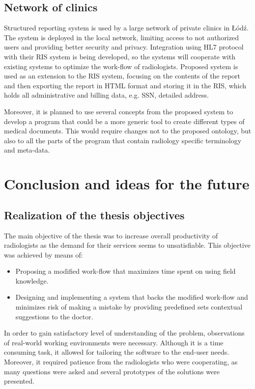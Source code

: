 \documentclass[12pt, twoside, openany]{report}
\theoremstyle{definition}
\begin{document}
\section{Network of clinics}
Structured reporting system is used by a large network of private clinics in Łódź. The system is deployed in the local network, limiting access to not authorized users and providing better security and privacy. Integration using HL7 protocol with their RIS system is being developed, so the systems will cooperate with existing systems to optimize the work-flow of radiologists. Proposed system is used as an extension to the RIS system, focusing on the contents of the report and then exporting the report in HTML format and storing it in the RIS, which holds all administrative and billing data, e.g. SSN, detailed address.

Moreover, it is planned to use several concepts from the proposed system to develop a program that could be a more generic tool to create different types of medical documents. This would require changes not to the proposed ontology, but also to all the parts of the program that contain radiology specific terminology and meta-data.


\chapter{Conclusion and ideas for the future}
\section{Realization of the thesis objectives}
The main objective of the thesis was to increase overall productivity of radiologists as the demand for their services seems to unsatisfiable. This objective was achieved by means of:
\begin{itemize}
	\item Proposing a modified work-flow that maximizes time spent on using field knowledge.
	\item Designing and implementing a system that backs the modified work-flow and minimizes risk of making a mistake by providing predefined sets contextual suggestions to the doctor.
\end{itemize}
In order to gain satisfactory level of understanding of the problem, observations of real-world working environments were necessary. Although it is a time consuming task, it allowed for tailoring the software to the end-user needs. Moreover, it required patience from the radiologists who were cooperating, as many questions were asked and several prototypes of the solutions were presented. 
\end{document}
